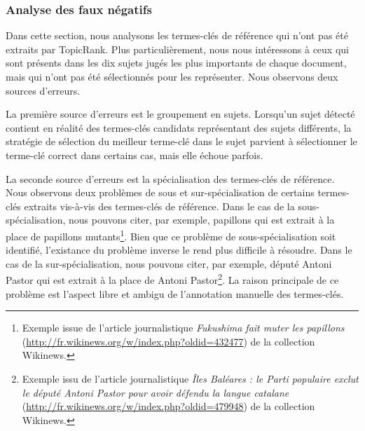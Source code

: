         \subsubsection{Analyse des faux négatifs}
        \label{subsubsec:main:domain_independent_keyphrase_extraction-unsupervised_automatic_keyphrase_extraction-error_analysis-false_negatives}
          Dans cette section, nous analysons les termes-clés de référence qui
          n'ont pas été extraits par TopicRank. Plus particulièrement, nous nous
          intéressons à ceux qui sont présents dans les dix sujets jugés les
          plus importants de chaque document, mais qui n'ont pas été
          sélectionnés pour les représenter. Nous observons deux sources
          d'erreurs.

          La première source d'erreurs est le groupement en sujets. Lorsqu'un
          sujet détecté contient en réalité des termes-clés candidats
          représentant des sujets différents, la stratégie de sélection du
          meilleur terme-clé dans le sujet parvient à sélectionner le terme-clé
          correct dans certains cas, mais elle échoue parfois.


          La seconde source d'erreurs est la spécialisation des termes-clés de
          référence. Nous observons deux problèmes de sous et sur-spécialisation
          de certains termes-clés extraits vis-à-vis des termes-clés de
          référence. Dans le cas de la sous-spécialisation, nous pouvons citer,
          par exemple, \og{}papillons\fg{} qui est extrait à la place de
          \og{}papillons mutants\fg{}\footnote{Exemple issue de l'article
          journalistique \textit{Fukushima fait muter les papillons}
          (\url{http://fr.wikinews.org/w/index.php?oldid=432477}) de la
          collection Wikinews.}. Bien que ce problème de sous-spécialisation
          soit identifié, l'existance du problème inverse le rend plus difficile
          à résoudre. Dans le cas de la sur-spécialisation, nous pouvons citer,
          par exemple, \og{}député Antoni Pastor\fg{} qui est extrait à la place
          de \og{}Antoni Pastor\fg{}\footnote{Exemple issu de l'article
          journalistique \textit{Îles Baléares : le Parti populaire exclut le
          député Antoni Pastor pour avoir défendu la langue catalane}
          (\url{http://fr.wikinews.org/w/index.php?oldid=479948}) de la
          collection Wikinews.}. La raison principale de ce problème est
          l'aspect libre et ambigu de l'annotation manuelle des termes-clés.


